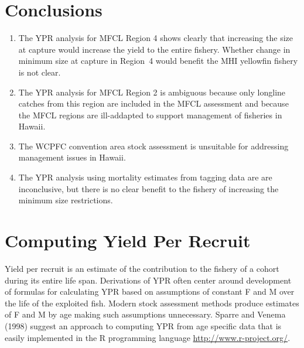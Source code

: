 \documentclass[12pt,letterpaper]{article}
\begin{document}
\section*{Conclusions}
\begin{enumerate}
\item The YPR analysis for MFCL Region 4 shows clearly that increasing
the size at capture would increase the yield to the entire fishery.
Whether change in minimum size at capture in Region~4 would benefit the MHI
yellowfin fishery is not clear.

\item The YPR analysis for MFCL Region 2 is ambiguous because only
longline catches from this region are included in the MFCL assessment
and because the
MFCL regions are ill-addapted to support management of fisheries in
Hawaii.

\item The WCPFC convention area stock assessment is unsuitable for
addressing management issues in Hawaii.

\item The YPR analysis using mortality estimates from tagging data are
are inconclusive, but there is no clear benefit to the fishery of
increasing the minimum size restrictions.



\end{enumerate}


\section*{Computing Yield Per Recruit}


Yield per recruit is an estimate of the contribution to the fishery of
a cohort during its entire life span.
Derivations of YPR often center around development of formulas for
calculating YPR based on assumptions of constant F and M over the life
of the exploited fish. Modern stock assessment methods produce
estimates of F and M by age making such assumptions unnecessary.
Sparre and Venema (1998) suggest an approach to computing YPR from age
specific data that is easily implemented in the R programming language
\url{http://www.r-project.org/}.
\end{document}
